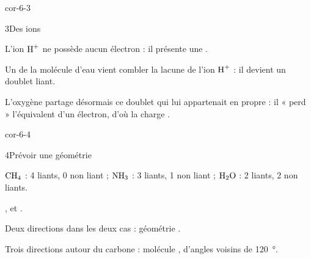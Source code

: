 \begin{blocLivre}{cor-6-3}
\begin{corrige}{3}{Des ions}
\begin{questions}
\item {} \quad {} \quad
{} \quad {}
\item L'ion $\ce{H+}$ ne possède aucun électron : il présente une .
\item Un  de la molécule d'eau vient combler la lacune de l'ion $\ce{H+}$ : il devient un
doublet liant.
\item L'oxygène partage désormais ce doublet qui lui appartenait en propre : il « perd » l'équivalent d'un électron, d'où la
charge \res{\oplus}.
\end{questions}
\end{corrige}
\end{blocLivre}
\begin{blocLivre}{cor-6-4}
\begin{corrige}{4}{Prévoir une géométrie}
\begin{questions}
\item $\ce{CH4}$ : 4 liants, 0 non liant ; $\ce{NH3}$ : 3 liants, 1 non liant ; $\ce{H2O}$ : 2 liants, 2 non liants.
\item {},  et .
\item Deux directions dans les deux cas : géométrie .
\item Trois directions autour du carbone : molécule , d'angles voisins de \qty{120}{\degree}.
\end{questions}
\end{corrige}
\end{blocLivre}
